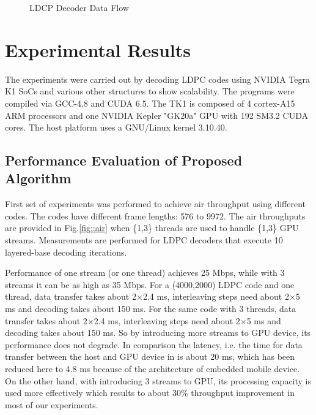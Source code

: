 \documentclass[conference]{IEEEtran}
\begin{document}
\begin{figure}[h]
\begin{centering}
\caption[width=.3\textwidth]{LDCP Decoder Data Flow}
\label{fig_total}
\end{centering}
\end{figure}

\section{Experimental Results} \label{sec4}

The experiments were carried out by decoding LDPC codes using NVIDIA Tegra K1 SoCs and various other structures to show scalability. The programs were compiled via GCC-4.8 and CUDA 6.5. The TK1 is composed of 4 cortex-A15 ARM processors and one NVIDIA Kepler "GK20a" GPU with 192 SM3.2 CUDA cores. The host platform uses a GNU/Linux kernel 3.10.40.

\subsection{Performance Evaluation of Proposed Algorithm} 
First set of experiments was performed to achieve air throughput using different codes. The codes have different frame lengths: 576 to 9972. The air throughputs are provided in Fig.\ref{fig::air} when \{1,3\} threads are used to handle \{1,3\} GPU streams. Measurements are performed for LDPC decoders that execute 10 layered-base decoding iterations.

Performance of one stream (or one thread) achieves 25 Mbps, while with 3 streams it can be as high as 35 Mbps. For a (4000,2000) LDPC code and one thread, data transfer takes about 2$\times$2.4 ms, interleaving steps need about 2$\times$5 ms and decoding takes about 150 ms. For the same code with 3 threads, data transfer takes about 2$\times$2.4 ms, interleaving steps need about 2$\times$5 ms and decoding takes about 150 ms. So by introducing more streams to GPU device, its performance does not degrade. In comparison the latency, i.e. the time for data transfer between the host and GPU device in \cite{art_gpu_0} is about 20 ms, which has been reduced here to 4.8 ms because of the architecture of embedded mobile device. On the other hand, with introducing 3 streams to GPU, its processing capacity is used more effectively which results to about 30\% throughput improvement in most of our experiments.
\end{document}
